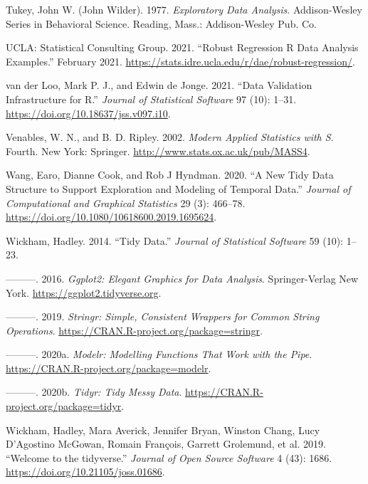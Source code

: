 \documentclass{article}
\begin{document}
\leavevmode\hypertarget{ref-tukey}{}%
Tukey, John W. (John Wilder). 1977. \emph{Exploratory Data Analysis}. Addison-Wesley Series in Behavioral Science. Reading, Mass.: Addison-Wesley Pub. Co.

\leavevmode\hypertarget{ref-rlm}{}%
UCLA: Statistical Consulting Group. 2021. ``Robust Regression \textbar{} R Data Analysis Examples.'' February 2021. \url{https://stats.idre.ucla.edu/r/dae/robust-regression/}.

\leavevmode\hypertarget{ref-validate}{}%
van der Loo, Mark P. J., and Edwin de Jonge. 2021. ``Data Validation Infrastructure for R.'' \emph{Journal of Statistical Software} 97 (10): 1--31. \url{https://doi.org/10.18637/jss.v097.i10}.

\leavevmode\hypertarget{ref-mass}{}%
Venables, W. N., and B. D. Ripley. 2002. \emph{Modern Applied Statistics with S}. Fourth. New York: Springer. \url{http://www.stats.ox.ac.uk/pub/MASS4}.

\leavevmode\hypertarget{ref-tsibble}{}%
Wang, Earo, Dianne Cook, and Rob J Hyndman. 2020. ``A New Tidy Data Structure to Support Exploration and Modeling of Temporal Data.'' \emph{Journal of Computational and Graphical Statistics} 29 (3): 466--78. \url{https://doi.org/10.1080/10618600.2019.1695624}.

\leavevmode\hypertarget{ref-WickhamHadley2014TD}{}%
Wickham, Hadley. 2014. ``Tidy Data.'' \emph{Journal of Statistical Software} 59 (10): 1--23.

\leavevmode\hypertarget{ref-ggplot2}{}%
---------. 2016. \emph{Ggplot2: Elegant Graphics for Data Analysis}. Springer-Verlag New York. \url{https://ggplot2.tidyverse.org}.

\leavevmode\hypertarget{ref-stringr}{}%
---------. 2019. \emph{Stringr: Simple, Consistent Wrappers for Common String Operations}. \url{https://CRAN.R-project.org/package=stringr}.

\leavevmode\hypertarget{ref-modelr}{}%
---------. 2020a. \emph{Modelr: Modelling Functions That Work with the Pipe}. \url{https://CRAN.R-project.org/package=modelr}.

\leavevmode\hypertarget{ref-tidyr}{}%
---------. 2020b. \emph{Tidyr: Tidy Messy Data}. \url{https://CRAN.R-project.org/package=tidyr}.

\leavevmode\hypertarget{ref-tidyverse}{}%
Wickham, Hadley, Mara Averick, Jennifer Bryan, Winston Chang, Lucy D'Agostino McGowan, Romain François, Garrett Grolemund, et al. 2019. ``Welcome to the tidyverse.'' \emph{Journal of Open Source Software} 4 (43): 1686. \url{https://doi.org/10.21105/joss.01686}.
\end{document}
